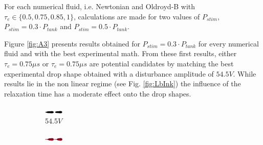 \documentclass[twocolumn,10pt]{asme2ej}
\begin{document}
For each numerical fluid, i.e. Newtonian and Oldroyd-B with $\tau_e \in  \{0.5,0.75,0.85,1\}$, calculations are made for two values of $P_{stim}$, $P_{stim}= 0.3\cdot P_{tank}$ and $P_{stim}= 0.5\cdot P_{tank}$. 

Figure \ref{fig:A3} presents results obtained for $P_{stim}=0.3\cdot P_{tank}$ for every numerical fluid and with the best experimental math. From these first results, either $\tau_e = 0.75 \mu s$  or $\tau_e = 0.75 \mu s$ are potential candidates by matching the best experimental drop shape obtained with a  disturbance amplitude of $54.5V$. While results lie in the non linear regime (see Fig. \ref{fig:LbInk}) the influence of the relaxation time has a moderate effect onto the drop shapes.

\begin{figure}[]

    \begin{subfigure}[t]{1.6cm}
        \centering
        \includegraphics[angle=-90,origin=c,width=0.9cm]{Encre/exp_A5.png}        
        \caption{54.5$V$}
    \end{subfigure}
    \hfill
    \begin{subfigure}[t]{1.7cm}
        \centering
        \includegraphics[angle=-90,origin=c,width=0.9cm]{Encre/0_A5.png}


\end{subfigure}
\end{figure}
\end{document}

